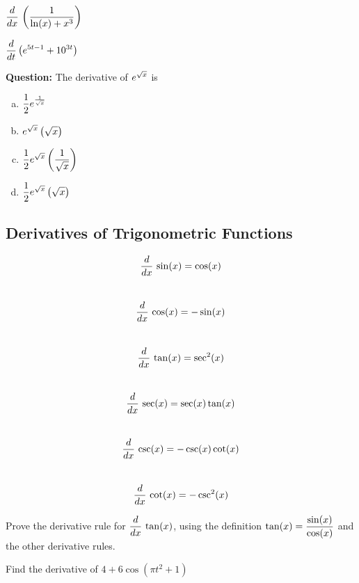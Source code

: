 \vfill

\newpage
$\displaystyle \frac{d}{dx} \, \left( \frac{1}{\ln(x)+x^3} \right)$

\vfill

\newpage

$\displaystyle \frac{d{}}{dt} \left( e^{5t-1} + 10^{3t} \right)$

\vfill

\newpage
{\bf Question: } The derivative of $\displaystyle e^{\sqrt{x}}$ is 

\begin{enumerate}[(a)]
\item $\displaystyle  \frac{1}{2} e^{\frac{1}{\sqrt{x}}}$ \\[1ex]
\item $\displaystyle e^{\sqrt{x}} \left(\sqrt{x}\right)$  \\[1ex]
\item $\displaystyle \frac{1}{2} e^{\sqrt{x}} \left(\frac{1}{\sqrt{x}}\right)$ \\[1ex]
\item $\displaystyle \frac{1}{2} e^{\sqrt{x}} \left(\sqrt{x}\right)$
\end{enumerate}

\vfill

\newpage



\subsection*{Derivatives of Trigonometric Functions}
\begin{boxnote}
$$ \displaystyle \frac{d}{dx} \, \sin( x) = \cos (x)$$ \\[-2.0ex]
$$ \displaystyle \frac{d}{dx} \, \cos( x) = - \sin (x)$$ \\[-2.0ex]
$$ \displaystyle \frac{d}{dx} \, \tan(x) = \sec^2 (x)$$ \\[-2.0ex]
$$ \displaystyle \frac{d}{dx} \, \sec(x) = \sec(x)\tan(x)$$ \\[-2.0ex]
$$ \displaystyle \frac{d}{dx} \, \csc(x) = -\csc(x)\cot(x)$$ \\[-2.0ex]
$$ \displaystyle \frac{d}{dx} \, \cot(x) = -\csc^2(x)$$
\end{boxnote}

\newpage
\problem Prove the derivative rule for $\displaystyle \frac{d}{dx} \, \tan(x)$, using the
definition $\displaystyle \tan(x)= \frac{\sin(x)}{\cos(x)}$ and the other
derivative rules.

\vfill

\newpage

\problem Find the derivative of $4 + 6 \cos(\pi t^2 + 1)$

